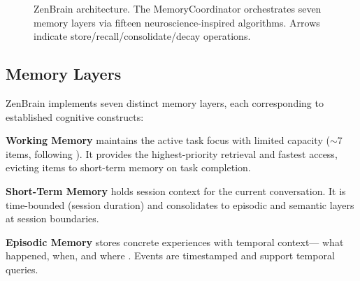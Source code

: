 \documentclass{article}
\begin{document}
\begin{figure}[t]
    \caption{ZenBrain architecture. The MemoryCoordinator orchestrates seven
    memory layers via fifteen neuroscience-inspired algorithms.
    Arrows indicate store/recall/consolidate/decay operations.}
    \label{fig:architecture}
\end{figure}

\subsection{Memory Layers}

ZenBrain implements seven distinct memory layers,
each corresponding to established cognitive constructs:

\textbf{Working Memory} maintains the active task focus with limited capacity
($\sim$7 items, following \citealt{miller1956}).
It provides the highest-priority retrieval and fastest access,
evicting items to short-term memory on task completion.

\textbf{Short-Term Memory} holds session context for the current conversation.
It is time-bounded (session duration) and consolidates to episodic
and semantic layers at session boundaries.

\textbf{Episodic Memory} stores concrete experiences with temporal context---
what happened, when, and where \citep{tulving1972}.
Events are timestamped and support temporal queries.
\end{document}
